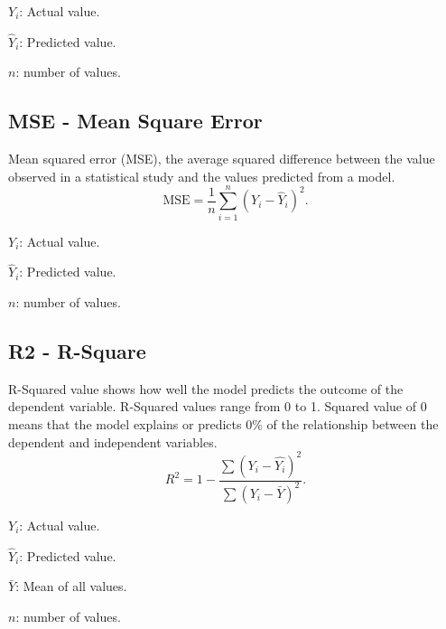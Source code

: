 $Y_{i}$: Actual value.

$\hat{Y}_{i}$: Predicted value.

$n$: number of values.

\subsection{MSE - Mean Square Error}
\label{mse}
Mean squared error (MSE), the average squared difference between the value
observed in a statistical study and the values predicted from a model.
\begin{equation}
	\mathrm{MSE}=\frac{1}{n}\sum_{i=1}^{n}\left(Y_{i}-\hat{Y}_{i}\right)^{2}.
\end{equation}

$Y_{i}$: Actual value.

$\hat{Y}_{i}$: Predicted value.

$n$: number of values.

\subsection{R2 - R-Square}
\label{r2}
R-Squared value shows how well the model predicts the outcome of the dependent
variable. R-Squared values range from 0 to 1. Squared value of 0 means that the model
explains or predicts 0\% of the relationship between the dependent and
independent variables.
\begin{equation}
	R^{2}=1-\frac{\sum\left(Y_{i}-\hat{Y_i}\right)^{2}}{\sum\left(Y_{i}-\bar{Y}\right)^{2}}
	.
\end{equation}

$Y_{i}$: Actual value.

$\hat{Y}_{i}$: Predicted value.

$\bar{Y}$: Mean of all values.

$n$: number of values.